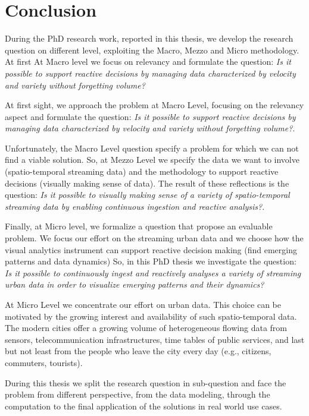 \chapter{Conclusion}\label{ch:conclusion}

During the PhD research work, reported in this thesis, we develop the research question on different level, exploiting the Macro, Mezzo and Micro methodology.
At first At Macro level we focus on relevancy and formulate the question: \textit{Is it possible to support reactive decisions by managing data characterized by velocity and variety without forgetting volume?}

At first sight, we approach the problem at Macro Level, focusing on the relevancy aspect and formulate the question: \textit{Is it possible to support reactive decisions by managing data characterized by velocity and variety without forgetting volume?}.

Unfortunately, the Macro Level question specify a problem for which we can not find a viable solution. So, at Mezzo Level we specify the data we want to involve (spatio-temporal streaming data) and the methodology to support reactive decisions (visually making sense of data). The result of these reflections is the question: \textit{Is it possible to visually making sense of a variety of spatio-temporal streaming data by enabling continuous ingestion and reactive analysis?}.

Finally, at Micro level, we formalize a question that propose an evaluable problem. We focus our effort on the streaming urban data and we choose how the visual analytics instrument can support reactive decision making (find emerging patterns and data dynamics)
So, in this PhD thesis we investigate the question: \textit{Is it possible to continuously ingest and reactively analyses a variety of streaming urban data in order to visualize emerging patterns and their dynamics?}

At Micro Level we concentrate our effort on urban data. This choice can be motivated by the growing interest and availability of such spatio-temporal data.
The modern cities offer a growing volume of heterogeneous flowing data from sensors, telecommunication infrastructures, time tables of public services, and last but not least from the people who leave the city every day (e.g., citizens, commuters, tourists).

During this thesis we split the research question in sub-question and face the problem from different perspective, from the data modeling, through the computation to the final application of the solutions in real world use cases. 

